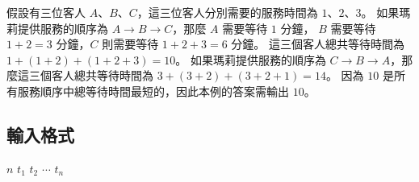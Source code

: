假設有三位客人
\begin{math}A\end{math}、\begin{math}B\end{math}、\begin{math}C\end{math}，這三位客人分別需要的服務時間為
\begin{math}1\end{math}、\begin{math}2\end{math}、\begin{math}3\end{math}。
如果瑪莉提供服務的順序為 \begin{math}A \to B \to C\end{math}，那麼
\begin{math}A\end{math} 需要等待 \begin{math}1\end{math} 分鐘，
\begin{math}B\end{math} 需要等待 \begin{math}1+2 = 3\end{math}
分鐘，\begin{math}C\end{math} 則需要等待 \begin{math}1+2+3=6\end{math}
分鐘。 這三個客人總共等待時間為
\begin{math}1 + (1+2) + (1+2+3) = 10\end{math}。
如果瑪莉提供服務的順序為
\begin{math}C \to B \to A\end{math}，那麼這三個客人總共等待時間為
\begin{math}3 + (3+2) + (3+2+1) = 14\end{math}。 因為
\begin{math}10\end{math}
是所有服務順序中總等待時間最短的，因此本例的答案需輸出
\begin{math}10\end{math}。

\subsection{輸入格式}

\begin{format}
\f{
$n$
$t_1$ $t_2$ $\cdots$ $t_n$
}
\end{format}

